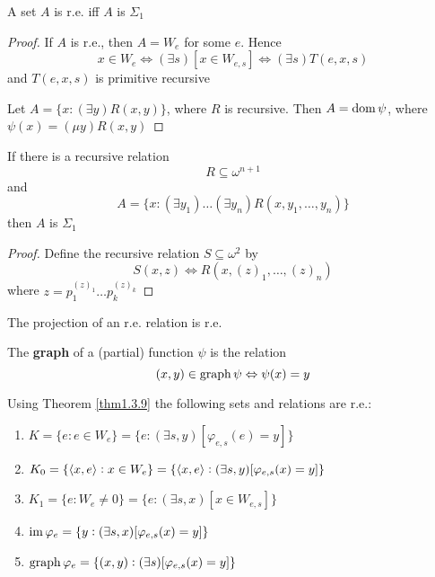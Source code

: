 \documentclass[11pt]{article}
\begin{document}
\begin{theorem}
\label{thm2.1.2}
A set \(A\) is r.e. iff \(A\) is \(\Sigma_1\)
\end{theorem}

\begin{proof}
If \(A\) is r.e., then \(A=W_e\) for some \(e\). Hence
\begin{equation*}
x\in W_e\Leftrightarrow(\exists s)[x\in W_{e,s}]\Leftrightarrow
(\exists s)T(e,x,s)
\end{equation*}
and \(T(e,x,s)\) is primitive recursive

Let \(A=\{x:(\exists y)R(x,y)\}\), where \(R\) is recursive. Then
\(A=\operatorname{dom}\psi\), where \(\psi(x)=(\mu y)R(x,y)\)
\end{proof}

\begin{theorem}
\label{thm2.1.3}
If there is a recursive relation
\begin{equation*}
R\subseteq\omega^{n+1}
\end{equation*}
and
\begin{equation*}
A=\{x:(\exists y_1)\dots(\exists y_n)R(x,y_1,\dots,y_n)\}
\end{equation*}
then \(A\) is \(\Sigma_1\)
\end{theorem}

\begin{proof}
Define the recursive relation \(S\subseteq \omega^2\) by
\begin{equation*}
S(x,z)\Leftrightarrow R(x,(z)_1,\dots,(z)_n)
\end{equation*}
where \(z=p_1^{(z)_1}\dots p_k^{(z)_k}\)
\end{proof}

\begin{corollary}[]
\label{cor2.1.4}
The projection of an r.e. relation is r.e.
\end{corollary}

\begin{definition}[]
The \textbf{graph} of a (partial) function \(\psi\) is the relation
\begin{equation*}
(x,y)\in\operatorname{graph}\psi\Leftrightarrow\psi(x)=y
\end{equation*}
\end{definition}

Using Theorem \ref{thm1.3.9} the following sets and relations are r.e.:
\begin{enumerate}
\item \(K=\{e:e\in W_e\}=\{e:(\exists s,y)[\varphi_{e,s}(e)=y]\}\)
\item \(K_0=\{\langle x,e\rangle:x\in W_e\}=\{\langle x,e\rangle:(\exists s,y)[\varphi_{e,s}(x)=y]\}\)
\item \(K_1=\{e:W_e\neq0\}=\{e:(\exists s,x)[x\in W_{e,s}]\}\)
\item \(\operatorname{im}\varphi_e=\{y:(\exists s,x)[\varphi_{e,s}(x)=y]\}\)
\item \(\operatorname{graph}\varphi_e=\{(x,y):(\exists s)[\varphi_{e,s}(x)=y]\}\)
\end{enumerate}
\end{document}
